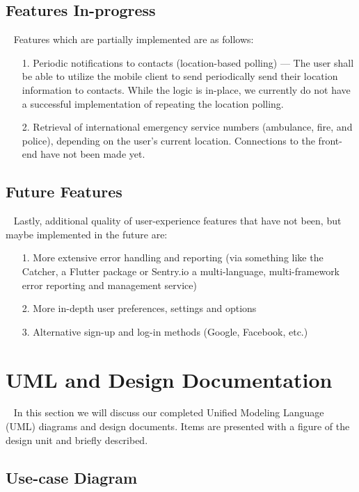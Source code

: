 \documentclass[10pt, a4paper]{article}
\begin{document}
\subsection{Features In-progress}
\par ~ Features which are partially implemented are as follows:
\begin{enumerate}
	\item[1.] Periodic notifications to contacts (location-based polling) --- The user shall be able to utilize the mobile client to send periodically send their location information to contacts. While the logic is in-place, we currently do not have a successful implementation of repeating the location polling.
	\item[2.] Retrieval of international emergency service numbers (ambulance, fire, and police), depending on the user's current location. Connections to the front-end have not been made yet.
\end{enumerate}

\subsection{Future Features}
\par ~ Lastly, additional quality of user-experience features that have not been, but maybe implemented in the future are:
\begin{enumerate}
	\item[1.] More extensive error handling and reporting (via something like the Catcher, a Flutter package or Sentry.io a multi-language, multi-framework error reporting and management service)
	\item[2.] More in-depth user preferences, settings and options
	\item[3.] Alternative sign-up and log-in methods (Google, Facebook, etc.)
\end{enumerate}

\section{UML and Design Documentation}
\par ~ In this section we will discuss our completed Unified Modeling Language (UML) diagrams and design documents. Items are presented with a figure of the design unit and briefly described.

\subsection{Use-case Diagram}
\end{document}
